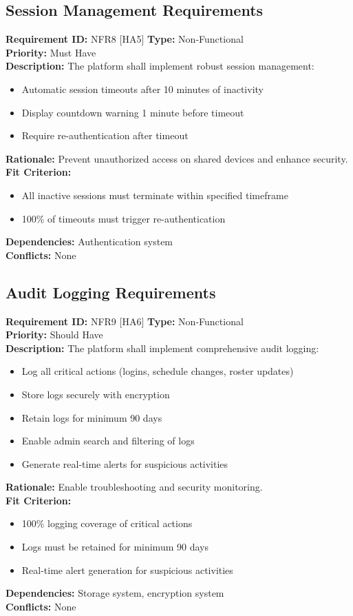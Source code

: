 \documentclass[12pt, titlepage]{article}
\begin{document}
\subsection{Session Management Requirements}
\textbf{Requirement ID:} NFR8 [HA5] \quad \textbf{Type:} Non-Functional \\
\textbf{Priority:} Must Have \\
\textbf{Description:} The platform shall implement robust session management:
\begin{itemize}
    \item Automatic session timeouts after 10 minutes of inactivity
    \item Display countdown warning 1 minute before timeout
    \item Require re-authentication after timeout
\end{itemize}
\textbf{Rationale:} Prevent unauthorized access on shared devices and enhance security.\\
\textbf{Fit Criterion:} 
\begin{itemize}
    \item All inactive sessions must terminate within specified timeframe
    \item 100\% of timeouts must trigger re-authentication
\end{itemize}
\textbf{Dependencies:} Authentication system\\
\textbf{Conflicts:} None\\

\subsection{Audit Logging Requirements}
\textbf{Requirement ID:} NFR9 [HA6] \quad \textbf{Type:} Non-Functional \\
\textbf{Priority:} Should Have \\
\textbf{Description:} The platform shall implement comprehensive audit logging:
\begin{itemize}
    \item Log all critical actions (logins, schedule changes, roster updates)
    \item Store logs securely with encryption
    \item Retain logs for minimum 90 days
    \item Enable admin search and filtering of logs
    \item Generate real-time alerts for suspicious activities
\end{itemize}
\textbf{Rationale:} Enable troubleshooting and security monitoring.\\
\textbf{Fit Criterion:} 
\begin{itemize}
    \item 100\% logging coverage of critical actions
    \item Logs must be retained for minimum 90 days
    \item Real-time alert generation for suspicious activities
\end{itemize}
\textbf{Dependencies:} Storage system, encryption system\\
\textbf{Conflicts:} None\\
\end{document}
